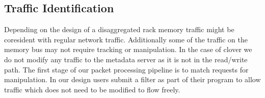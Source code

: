 

\subsection{Traffic Identification} Depending on the design of a disaggregated
rack memory traffic might be coresident with regular network traffic.
Additionally some of the traffic on the memory bus may not require tracking or
manipulation. In the case of clover we do not modify any traffic to the metadata
server as it is not in the read/write path. The first stage of our packet
processing pipeline is to match requests for manipulation. In our design users
submit a filter as part of their program to allow traffic which does not need to
be modified to flow freely.

